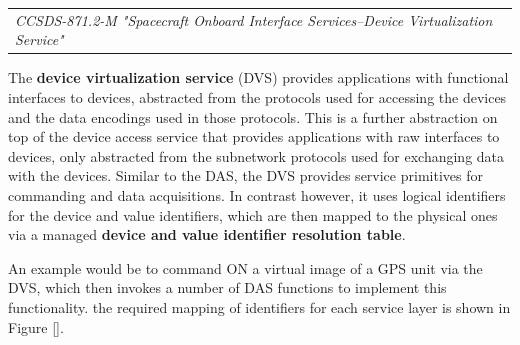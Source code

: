 \begin{tabular}{l}
\textit{CCSDS-871.2-M "Spacecraft Onboard Interface Services--Device Virtualization Service" \cite{CCSDS-871.2-M}} 
\end{tabular}

The \textbf{device virtualization service} (DVS) provides applications with functional interfaces to devices, abstracted from the protocols used for accessing the devices and the data encodings used in those protocols. This is a further abstraction on top of the device access service that provides applications with raw interfaces to devices, only abstracted from the subnetwork protocols used for exchanging data with the devices. Similar to the DAS, the DVS provides service primitives for commanding and data acquisitions. In contrast however, it uses logical identifiers for the device and value identifiers, which are then mapped to the physical ones via a managed \textbf{device and value identifier resolution table}.

An example would be to command ON a virtual image of a GPS unit via the DVS, which then invokes a number of DAS functions to implement this functionality. the required mapping of identifiers for each service layer is shown in Figure \ref{}.

